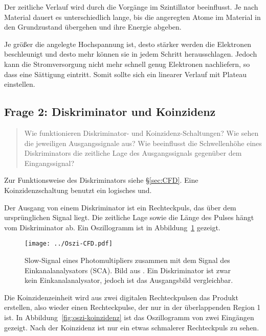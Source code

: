 \documentclass[11pt, ngerman, fleqn, DIV=15, headinclude, BCOR=2cm]{scrreprt}
\begin{document}
Der zeitliche Verlauf wird durch die Vorgänge im Szintillator beeinflusst. Je
nach Material dauert es unterschiedlich lange, bis die angeregten Atome im
Material in den Grundzustand übergehen und ihre Energie abgeben.

Je größer die angelegte Hochspannung ist, desto stärker werden die Elektronen
beschleunigt und desto mehr können sie in jedem Schritt herausschlagen. Jedoch
kann die Stromversorgung nicht mehr schnell genug Elektronen nachliefern, so
dass eine Sättigung eintritt. Somit sollte sich ein linearer Verlauf mit
Plateau einstellen.

\subsection{Frage 2: Diskriminator und Koinzidenz}

\begin{quote}
    Wie funktionieren Diskriminator- und Koinzidenz-Schaltungen? Wie sehen die
    jeweiligen Ausgangssignale aus? Wie beeinflusst die Schwellenhöhe eines
    Diskriminators die zeitliche Lage des Ausgangssignals gegenüber dem
    Eingangssignal?
\end{quote}

Zur Funktionsweise des Diskriminators siehe §\ref{sec:CFD}. Eine
Koinzidenzschaltung benutzt ein logisches und.

Der Ausgang von einem Diskriminator ist ein Rechteckpuls, das über dem
ursprünglichen Signal liegt. Die zeitliche Lage sowie die Länge des Pulses
hängt vom Diskriminator ab. Ein Oszillogramm ist in
Abbildung~\ref{fig:oszi-cfd} gezeigt.

\begin{figure}[htbp]
    \centering
    \texttt{[image: ../Oszi-CFD.pdf]}
    \caption{%
        Slow-Signal eines Photomultipliers zusammen mit dem
        Signal des Einkanalanalysators (SCA). Bild aus
        \parencite[Abbildung~2.8]{Ueding/525}. Ein Diskriminator ist zwar kein
        Einkanalanalysator, jedoch ist das Ausgangsbild vergleichbar.
    }
    \label{fig:oszi-cfd}
\end{figure}

Die Koinzidenzeinheit wird aus zwei digitalen Rechteckpulsen das Produkt
erstellen, also wieder einen Rechteckpulse, der nur in der überlappenden Region
1 ist. In Abbildung~\ref{fig:oszi-koinzidenz} ist das Oszillogramm von zwei
Eingängen gezeigt. Nach der Koinzidenz ist nur ein etwas schmalerer
Rechteckpuls zu sehen.
\end{document}
